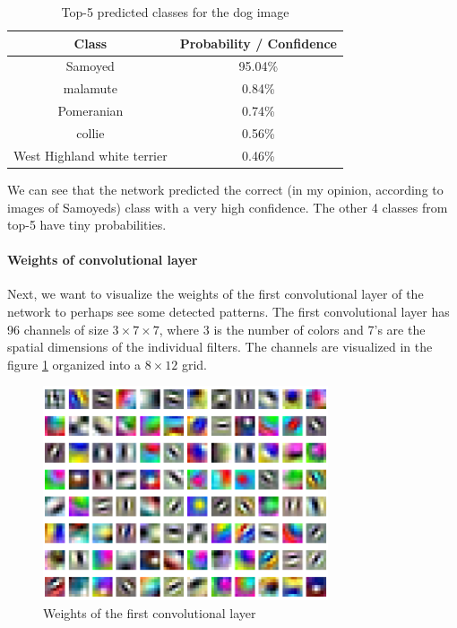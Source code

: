 \documentclass[a4paper,11pt]{article}
\begin{document}
\begin{table}[ht]
    \centering
    \begin{tabular}{|c|c|}
        \hline
        \textbf{Class}              & \textbf{Probability / Confidence} \\
        \hline
        \hline
        Samoyed                     & 95.04\%                           \\
        malamute                    & 0.84\%                            \\
        Pomeranian                  & 0.74\%                            \\
        collie                      & 0.56\%                            \\
        West Highland white terrier & 0.46\%                            \\
        \hline
    \end{tabular}
    \caption{Top-5 predicted classes for the dog image}
    \label{table:dog}
\end{table}

We can see that the network predicted the correct (in my opinion, according to images of Samoyeds) class with a very high confidence.
The other 4 classes from top-5 have tiny probabilities.

\paragraph*{Weights of convolutional layer} Next, we want to visualize the weights of the first convolutional layer of the network to perhaps see some detected patterns.
The first convolutional layer has 96 channels of size $3 \times 7 \times 7$, where 3 is the number of colors and 7's are the spatial dimensions of the individual filters.
The channels are visualized in the figure \ref{fig:cnn-weights} organized into a $8 \times 12$ grid.

\begin{figure}[ht]
    \centering
    \includegraphics[width=0.75\textwidth]{../out/01_first_layer_weights.png}
    \caption{Weights of the first convolutional layer}
    \label{fig:cnn-weights}
\end{figure}
\end{document}

